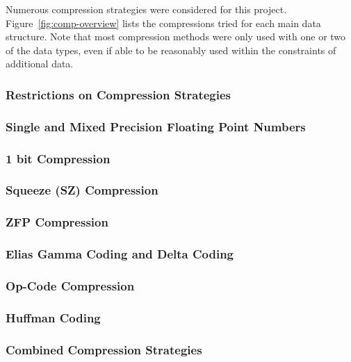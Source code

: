 Numerous compression strategies were considered for this project.
Figure~\ref{fig:comp-overview} lists the compressions tried for each main data structure.
Note that most compression methods were only used with one or two of the data types, even if able to be reasonably used within the constraints of additional data.



\subsubsection{Restrictions on Compression Strategies}


\subsubsection{Single and Mixed Precision Floating Point Numbers}

\subsubsection{1 bit Compression}

\subsubsection{Squeeze (SZ) Compression}

\subsubsection{ZFP Compression}

\subsubsection{Elias Gamma Coding and Delta Coding}

\subsubsection{Op-Code Compression}

\subsubsection{Huffman Coding}

\subsubsection{Combined Compression Strategies}

